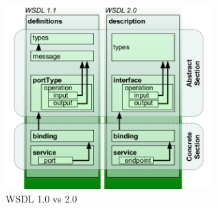 \documentclass{note}
\begin{document}
\begin{figure}[hbt]
\centerline{\includegraphics[width=8cm]{pics/wsdl}}
\caption{WSDL 1.0 vs 2.0}
\end{figure}
\end{document}
